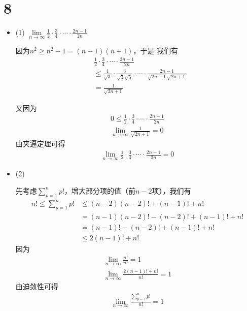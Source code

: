 \documentclass{article}
\begin{document}
\section*{8}

\begin{itemize}
  \item (1) $\lim\limits_{n \to \infty} \frac{1}{2} \cdot \frac{3}{4} \cdot \cdots \cdot \frac{2n - 1}{2n}$

        因为$n^2 \geq n^2 - 1 = (n - 1)(n + 1)$，于是
        我们有
        \begin{align*}
           & \frac{1}{2} \cdot \frac{3}{4} \cdot \cdots \cdot \frac{2n -1}{2n}                                              \\
           & \leq \frac{1}{\sqrt{3}} \cdot \frac{3}{\sqrt{3}\sqrt{5}} \cdot \cdots \cdot \frac{2n - 1}{\sqrt{2n - 1}\sqrt{2n+1}} \\
           & = \frac{1}{\sqrt{2n + 1}}
        \end{align*}

        又因为
        \begin{align*}
          0 \leq \frac{1}{2} \cdot \frac{3}{4} \cdot \cdots \cdot \frac{2n - 1}{2n} \\
          \lim\limits_{n \to \infty} \frac{1}{\sqrt{2n + 1}} = 0
        \end{align*}
        由夹逼定理可得
        \begin{align*}
          \lim\limits_{n \to \infty} \frac{1}{2} \cdot \frac{3}{4} \cdot \cdots \cdot \frac{2n - 1}{2n} = 0
        \end{align*}

  \item (2)

        先考虑$\sum\limits_{p=1}^n p!$，增大部分项的值（前$n - 2$项），我们有
        \begin{align*}
          n ! \leq \sum\limits_{p=1}^n p! & \leq (n-2)(n-2)! + (n-1)! + n!         \\
                                          & = (n - 1)(n-2)! - (n-2)! + (n-1)! + n! \\
                                          & = (n-1)! - (n - 2)! + (n-1)! + n!      \\
                                          & \leq 2(n-1)! + n!
        \end{align*}
        因为
        \begin{align*}
          \lim\limits_{n \to \infty} \frac{n!}{n!} = 1 \\
          \lim\limits_{n \to \infty} \frac{2(n-1)! + n!}{n!} = 1
        \end{align*}
        由迫敛性可得
        \begin{align*}
          \lim\limits_{n \to \infty} \frac{\sum\limits_{p=1}^n p!}{n!} = 1
        \end{align*}


\end{itemize}
\end{document}
